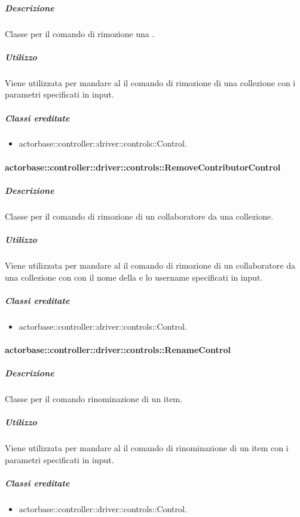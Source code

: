 \documentclass{scalatekids-article}
\begin{document}
\subparagraph{Descrizione}

Classe per il comando di rimozione una .

\subparagraph{Utilizzo}

Viene utilizzata per mandare al  il comando di rimozione di una collezione con i parametri specificati in input.

\subparagraph{Classi ereditate}

\begin{itemize}
\item actorbase::controller::driver::controls::Control.
\end{itemize}

\paragraph{actorbase::controller::driver::controls::RemoveContributorControl}

\subparagraph{Descrizione}

Classe per il comando di rimozione di un collaboratore da una collezione.

\subparagraph{Utilizzo}

Viene utilizzata per mandare al  il comando di rimozione di un collaboratore da una collezione con con il nome della  e lo username specificati in input.

\subparagraph{Classi ereditate}

\begin{itemize}
\item actorbase::controller::driver::controls::Control.
\end{itemize}

\paragraph{actorbase::controller::driver::controls::RenameControl}

\subparagraph{Descrizione}

Classe per il comando rinominazione di un item.

\subparagraph{Utilizzo}

Viene utilizzata per mandare al  il comando di rinominazione di un item con i parametri specificati in input.

\subparagraph{Classi ereditate}

\begin{itemize}
\item actorbase::controller::driver::controls::Control.
\end{itemize}
\end{document}
